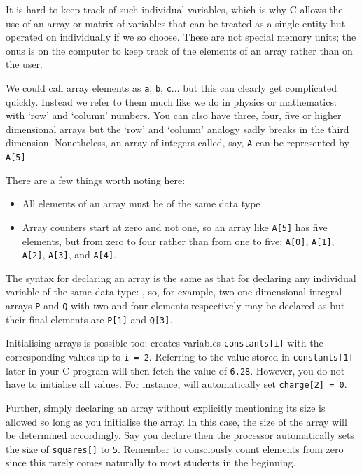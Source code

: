 \documentclass[11pt,oneside]{article}
\begin{document}
{{{{{{{{{It is hard to keep track of such individual variables, which is why C allows the use of an array or matrix of variables that can be treated as a single entity but operated on individually if we so choose. These are not special memory units; the onus is on the computer to keep track of the elements of an array rather than on the user.

We could call array elements as \verb+a+, \verb+b+, \verb+c+... but this can clearly get complicated quickly. Instead we refer to them much like we do in physics or mathematics: with `row' and `column' numbers. You can also have three, four, five or higher dimensional arrays but the `row' and `column' analogy sadly breaks in the third dimension. Nonetheless, an array of integers called, say, \verb+A+ can be represented by \verb+A[5]+.

There are a few things worth noting here: \vspace*{-0.75em}
\begin{itemize}
\itemsep-0.25em
\renewcommand\labelitemi{---}
\item All elements of an array must be of the same data type
\item Array counters start at zero and not one, so an array like \verb+A[5]+ has five elements, but from zero to four rather than from one to five: \verb+A[0]+, \verb+A[1]+, \verb+A[2]+, \verb+A[3]+, and \verb+A[4]+.
\end{itemize}\vspace*{-0.8em}
The syntax for declaring an array is the same as that for declaring any individual variable of the same data type: , so, for example, two one-dimensional integral arrays \verb+P+ and \verb+Q+ with two and four elements respectively may be declared as  but their final elements are \verb+P[1]+ and \verb+Q[3]+.

Initialising arrays is possible too:  creates variables \verb+constants[i]+ with the corresponding values up to \verb+i = 2+. Referring to the value stored in \verb+constants[1]+ later in your C program will then fetch the value of \verb+6.28+. However, you do not have to initialise all values. For instance,  will automatically set \verb+charge[2] = 0+.

Further, simply declaring an array without explicitly mentioning its size is allowed so long as you initialise the array. In this case, the size of the array will be determined accordingly. Say you declare  then the processor automatically sets the size of \verb+squares[]+ to \verb+5+. Remember to consciously count elements from zero since this rarely comes naturally to most students in the beginning.

}}}}}}}}}
\end{document}
